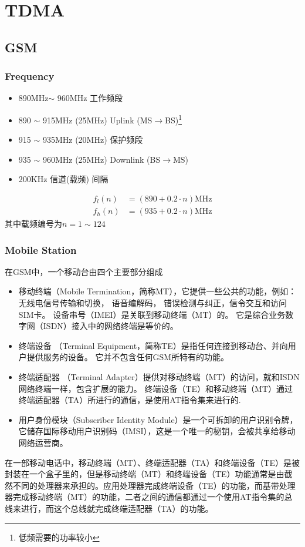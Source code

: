 \documentclass[a4paper]{report}
\begin{document}
\chapter{TDMA}
\section{GSM}
\subsection{Frequency} 
\label{sec:gsm:frequency}
\begin{itemize}
	\item 890MHz$\sim$ 960MHz 工作频段
	\item 890 $\sim$ 915MHz (25MHz) Uplink (MS$\rightarrow$BS)\footnote{低频需要的功率较小}
	\item 915 $\sim$ 935MHz (20MHz) 保护频段
	\item 935 $\sim$ 960MHz (25MHz) Downlink  (BS$\rightarrow$MS)
	\item 200KHz 信道(载频) 间隔
\end{itemize}
\begin{align*}
	f_l(n)&=(890+0.2\cdot n) \text{MHz} \\
	f_h(n)&=(935+0.2\cdot n) \text{MHz}
\end{align*}
其中载频编号为$n=1\sim 124$

\subsection{Mobile Station}
在GSM中，一个移动台由四个主要部分组成
\begin{itemize}
	\item 移动终端（Mobile Termination，简称MT），它提供一些公共的功能，例如：无线电信号传输和切换， 语音编解码， 错误检测与纠正，信令交互和访问SIM卡。 设备串号（IMEI）是关联到移动终端（MT）的。 它是综合业务数字网（ISDN）接入中的网络终端是等价的。
	\item 终端设备 （Terminal Equipment，简称TE）是指任何连接到移动台、并向用户提供服务的设备。 它并不包含任何GSM所特有的功能。
	\item 终端适配器 （Terminal Adapter）提供对移动终端（MT）的访问，就和ISDN网络终端一样，包含扩展的能力。 终端设备（TE）和移动终端（MT）通过终端适配器（TA）所进行的通信，是使用AT指令集来进行的.
	\item 用户身份模块（Subscriber Identity Module）是一个可拆卸的用户识别令牌，它储存国际移动用户识别码（IMSI），这是一个唯一的秘钥，会被共享给移动网络运营商。
\end{itemize}
在一部移动电话中，移动终端（MT）、终端适配器（TA）和终端设备（TE）是被封装在一个盒子里的，但是移动终端（MT）和终端设备（TE）功能通常是由截然不同的处理器来承担的。应用处理器完成终端设备（TE）的功能，而基带处理器完成移动终端（MT）的功能，二者之间的通信都通过一个使用AT指令集的总线来进行，而这个总线就完成终端适配器（TA）的功能。
\end{document}

